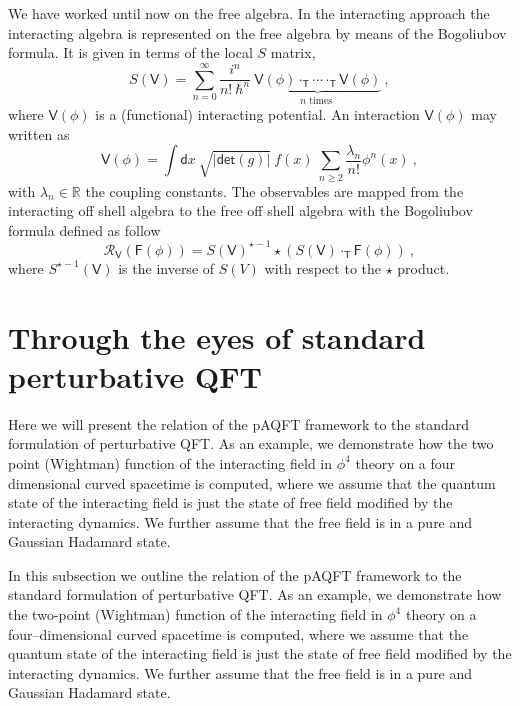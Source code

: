 \documentclass[10pt]{book}
\newcommand{\abs}[1]{\left|#1\right|}
\renewcommand{\det}{\mathsf{det}}
\let\int\int
\newcommand{\Rcal}{\mathcal{R}}
\newcommand{\Rbb}{\mathbb{R}}
\newcommand{\Fsf}{\mathsf{F}}
\newcommand{\Tsf}{\mathsf{T}}
\newcommand{\Vsf}{\mathsf{V}}
\newcommand{\dsf}{\mathsf{d}}
\theoremstyle{break}
\begin{document}
\bigskip


We have worked until now on the free algebra. In the interacting approach the interacting algebra is represented on the free algebra by means of the Bogoliubov formula. It is given in terms of the local $S$ matrix, 
%
\begin{equation*}
S(\Vsf) = \sum^\infty_{n=0} \frac{i^n}{n!\ \hbar^n} \ \underbrace{\Vsf(\phi) \cdot_\Tsf \cdots \cdot_\Tsf \Vsf(\phi)}_{n \mbox{ times }} \ ,
\end{equation*}
%
where $\Vsf(\phi)$ is a (functional) interacting potential. An interaction $\Vsf(\phi)$ may written as 
%
\begin{equation*}
\Vsf(\phi) = \int \dsf x \ \sqrt{\abs{\det(g)}} \ f(x) \ \sum_{n\geq 2} \frac{\lambda_n}{n!} \phi^n(x) \ ,
\end{equation*}
%
with $\lambda_n \in \Rbb$ the coupling constants. The observables are mapped from the interacting off shell algebra to the free off shell algebra with the Bogoliubov formula defined as follow 
%
\begin{equation*}
\Rcal_\Vsf(\Fsf(\phi)) = S(\Vsf)^{\star-1} \star \left( S(\Vsf) \cdot_\Tsf \Fsf(\phi) \right) \ ,
\end{equation*}
%
where $S^{\star-1}(\Vsf)$ is the inverse of $S(V)$ with respect to the $\star$ product. 







\section{Through the eyes of standard perturbative QFT}


Here we will present the relation of the pAQFT framework to the standard formulation of perturbative QFT. As an example, we demonstrate how the two point (Wightman) function of the interacting field in $\phi^4$ theory on a four dimensional curved spacetime is computed, where we assume that the quantum state of the interacting field is just the state of free field modified by the interacting dynamics. We further assume that the free field is in a pure and Gaussian Hadamard state. 

\bigskip



In this subsection we outline the relation of the pAQFT framework to the standard formulation of perturbative QFT. As an example, we demonstrate how the two-point (Wightman) function of the interacting field in $\phi^4$ theory on a four--dimensional curved spacetime is computed, where we assume that the quantum state of the interacting field is just the state of free field modified by the interacting dynamics. We further assume that the free field is in a pure and Gaussian Hadamard state. 
\end{document}
